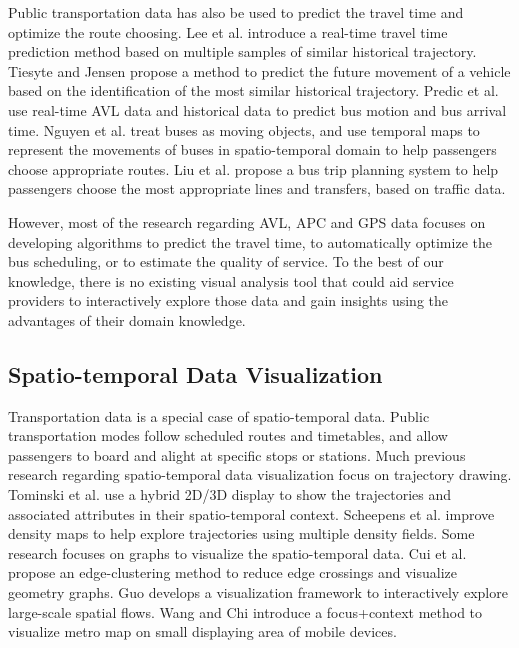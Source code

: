 \documentclass[journal]{vgtc}
\begin{document}
Public transportation data has also be used to predict the travel time and optimize the route choosing. 
Lee et al. \cite{Lee:2012:HNF:2424321.2424357} introduce a real-time travel time prediction method based on multiple samples of similar historical trajectory. 
Tiesyte and Jensen \cite{Tiesyte:2008:SPT:1463434.1463452} propose a method to predict the future movement of a vehicle based on the identification of the most similar historical trajectory. 
Predic et al. \cite{Predic2007} use real-time AVL data and historical data to predict bus motion and bus arrival time. 
Nguyen et al. \cite{Nguyen2012} treat buses as moving objects, and use temporal maps to represent the movements of buses in spatio-temporal domain to help passengers choose appropriate routes. 
Liu et al. \cite{5958130} propose a bus trip planning system to help passengers choose the most appropriate lines and transfers, based on traffic data.

However, most of the research regarding AVL, APC and GPS data focuses on developing algorithms to predict the travel time, to automatically optimize the bus scheduling, or to estimate the quality of service. To the best of our knowledge, there is no existing visual analysis tool that could aid service providers to interactively explore those data and gain insights using the advantages of their domain knowledge.

\subsection{Spatio-temporal Data Visualization}
Transportation data is a special case of spatio-temporal data. Public transportation modes follow scheduled routes and timetables, and allow passengers to board and alight at specific stops or stations. Much previous research regarding spatio-temporal data visualization focus on trajectory drawing. 
Tominski et al. \cite{Tominski2012} use a hybrid 2D/3D display to show the trajectories and associated attributes in their spatio-temporal context.
Scheepens et al. \cite{6065019} improve density maps to help explore trajectories using multiple density fields.
Some research focuses on graphs to visualize the spatio-temporal data.
Cui et al. \cite{4658140} propose an edge-clustering method to reduce edge crossings and visualize geometry graphs.
Guo \cite{5290710} develops a visualization framework to interactively explore large-scale spatial flows.
Wang and Chi \cite{6065020} introduce a focus+context method to visualize metro map on small displaying area of mobile devices.
\end{document}
